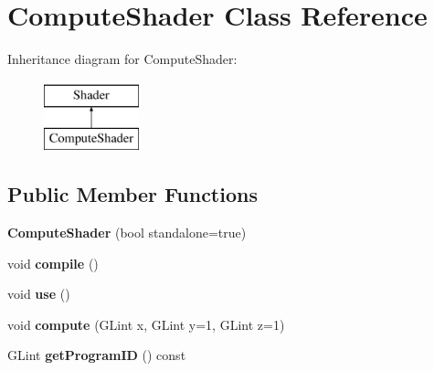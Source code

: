 \hypertarget{class_compute_shader}{\section{Compute\+Shader Class Reference}
\label{class_compute_shader}
}
Inheritance diagram for Compute\+Shader\+:\begin{figure}[H]
\begin{center}
\leavevmode
\includegraphics[height=2.000000cm]{class_compute_shader}
\end{center}
\end{figure}
\subsection*{Public Member Functions}
\begin{DoxyCompactItemize}
\item 
\hypertarget{class_compute_shader_a818f0e0836fa20a0f929c311a69bbb4b}{{\bfseries Compute\+Shader} (bool standalone=true)}\label{class_compute_shader_a818f0e0836fa20a0f929c311a69bbb4b}

\item 
\hypertarget{class_compute_shader_ac86652bbfdac9b93727da048e1b5a8aa}{void {\bfseries compile} ()}\label{class_compute_shader_ac86652bbfdac9b93727da048e1b5a8aa}

\item 
\hypertarget{class_compute_shader_a252c0422abdc92a1492dcd0255450fa9}{void {\bfseries use} ()}\label{class_compute_shader_a252c0422abdc92a1492dcd0255450fa9}

\item 
\hypertarget{class_compute_shader_a18cf7de584c2b0ba519f71adb9d232c1}{void {\bfseries compute} (G\+Lint x, G\+Lint y=1, G\+Lint z=1)}\label{class_compute_shader_a18cf7de584c2b0ba519f71adb9d232c1}

\item 
\hypertarget{class_compute_shader_a092e90d32702a438956480e5f4ff3f08}{G\+Lint {\bfseries get\+Program\+I\+D} () const }\label{class_compute_shader_a092e90d32702a438956480e5f4ff3f08}

\end{DoxyCompactItemize}
